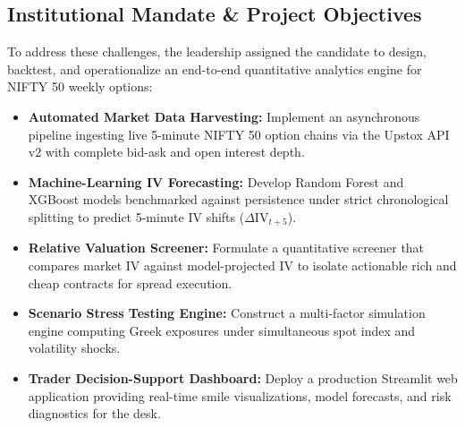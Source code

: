 \subsection{Institutional Mandate \& Project Objectives}
To address these challenges, the leadership assigned the candidate to design, backtest, and operationalize an end-to-end quantitative analytics engine for NIFTY 50 weekly options:
\begin{itemize}\setlength{\itemsep}{0pt}\setlength{\parskip}{0pt}
    \item \textbf{Automated Market Data Harvesting:} Implement an asynchronous pipeline ingesting live 5-minute NIFTY 50 option chains via the Upstox API v2 with complete bid-ask and open interest depth.
    \item \textbf{Machine-Learning IV Forecasting:} Develop Random Forest and XGBoost models benchmarked against persistence under strict chronological splitting to predict 5-minute IV shifts ($\Delta\text{IV}_{t+5}$).
    \item \textbf{Relative Valuation Screener:} Formulate a quantitative screener that compares market IV against model-projected IV to isolate actionable rich and cheap contracts for spread execution.
    \item \textbf{Scenario Stress Testing Engine:} Construct a multi-factor simulation engine computing Greek exposures under simultaneous spot index and volatility shocks.
    \item \textbf{Trader Decision-Support Dashboard:} Deploy a production Streamlit web application providing real-time smile visualizations, model forecasts, and risk diagnostics for the desk.
\end{itemize}
